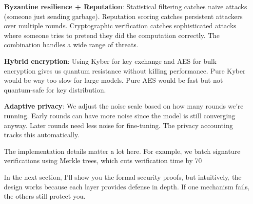 \documentclass[journal,onecolumn]{IEEEtran}
\begin{document}
\textbf{Byzantine resilience + Reputation}: Statistical filtering catches naive attacks (someone just sending garbage). Reputation scoring catches persistent attackers over multiple rounds. Cryptographic verification catches sophisticated attacks where someone tries to pretend they did the computation correctly. The combination handles a wide range of threats.

\textbf{Hybrid encryption}: Using Kyber for key exchange and AES for bulk encryption gives us quantum resistance without killing performance. Pure Kyber would be way too slow for large models. Pure AES would be fast but not quantum-safe for key distribution.

\textbf{Adaptive privacy}: We adjust the noise scale based on how many rounds we're running. Early rounds can have more noise since the model is still converging anyway. Later rounds need less noise for fine-tuning. The privacy accounting tracks this automatically.

The implementation details matter a lot here. For example, we batch signature verifications using Merkle trees, which cuts verification time by 70%

In the next section, I'll show you the formal security proofs, but intuitively, the design works because each layer provides defense in depth. If one mechanism fails, the others still protect you.
\end{document}

